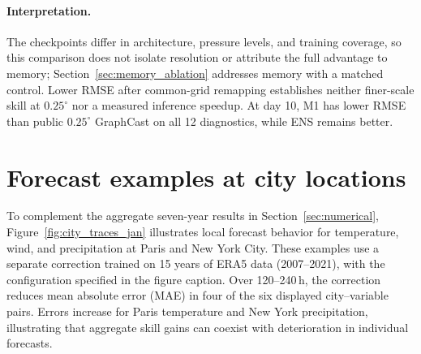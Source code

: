 \documentclass{article}
\newcommand{\vfourchange}[1]{{\color{blue}#1}}
\newif\ifvfivechanges
\begin{document}
\FloatBarrier
\paragraph{\vfourchange{Interpretation.}}
\ifvfivechanges
\par\begingroup\color{vfiveDeleted}\noindent
\sout{The figures show point estimates and pointwise date-sampling intervals for the specified fixed checkpoints on the available matched samples; these do not measure training-seed variation or simultaneous significance across diagnostics and leads. Ten-day verification windows overlap, so the starts are not independent weather realizations. Checkpoints also differ in architecture, pressure levels and training coverage; their comparison does not isolate resolution or attribute the full advantage to memory. The matched memory controls in Section~\mbox{\ref{sec:memory_ablation}} address the latter question. Lower RMSE after common-grid remapping establishes neither finer-scale skill at $0.25^\circ$ nor a measured inference speedup. At day 10, M1 has lower RMSE than the public $0.25^\circ$ checkpoint on all 12 diagnostics, but higher RMSE than ENS.}
\par\endgroup
\fi
\vfourchange{The checkpoints differ in architecture, pressure levels, and training coverage, so this comparison does not isolate resolution or attribute the full advantage to memory; Section~\ref{sec:memory_ablation} addresses memory with a matched control. Lower RMSE after common-grid remapping establishes neither finer-scale skill at $0.25^\circ$ nor a measured inference speedup. At day 10, M1 has lower RMSE than public $0.25^\circ$ GraphCast on all 12 diagnostics, while ENS remains better.}

\clearpage
\section{Forecast examples at city locations}
\label{app:city_traces}
To complement the aggregate seven-year results in Section~\ref{sec:numerical}, Figure~\ref{fig:city_traces_jan} illustrates local forecast behavior for temperature, wind, and precipitation at Paris and New York City. These examples use a separate correction trained on 15 years of ERA5 data (2007--2021), with the configuration specified in the figure caption. Over 120--240\,h, the correction reduces mean absolute error (MAE) in four of the six displayed city--variable pairs. Errors increase for Paris temperature and New York precipitation, illustrating that aggregate skill gains can coexist with deterioration in individual forecasts.
\end{document}
